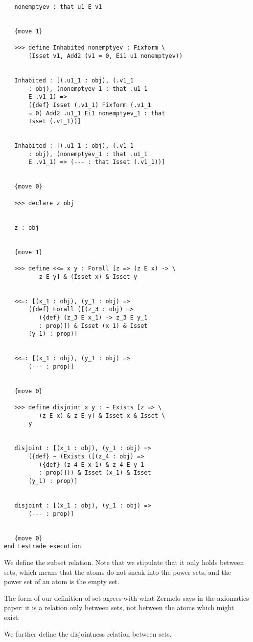\documentclass[12pt]{article}
\begin{document}
\begin{verbatim}
   nonemptyev : that u1 E v1


   {move 1}

   >>> define Inhabited nonemptyev : Fixform \
       (Isset v1, Add2 (v1 = 0, Ei1 u1 nonemptyev))


   Inhabited : [(.u1_1 : obj), (.v1_1 
       : obj), (nonemptyev_1 : that .u1_1 
       E .v1_1) => 
       ({def} Isset (.v1_1) Fixform (.v1_1 
       = 0) Add2 .u1_1 Ei1 nonemptyev_1 : that 
       Isset (.v1_1))]


   Inhabited : [(.u1_1 : obj), (.v1_1 
       : obj), (nonemptyev_1 : that .u1_1 
       E .v1_1) => (--- : that Isset (.v1_1))]


   {move 0}

   >>> declare z obj


   z : obj


   {move 1}

   >>> define <<= x y : Forall [z => (z E x) -> \
          z E y] & (Isset x) & Isset y


   <<=: [(x_1 : obj), (y_1 : obj) => 
       ({def} Forall ([(z_3 : obj) => 
          ({def} (z_3 E x_1) -> z_3 E y_1 
          : prop)]) & Isset (x_1) & Isset 
       (y_1) : prop)]


   <<=: [(x_1 : obj), (y_1 : obj) => 
       (--- : prop)]


   {move 0}

   >>> define disjoint x y : ~ Exists [z => \
          (z E x) & z E y] & Isset x & Isset \
       y


   disjoint : [(x_1 : obj), (y_1 : obj) => 
       ({def} ~ (Exists ([(z_4 : obj) => 
          ({def} (z_4 E x_1) & z_4 E y_1 
          : prop)])) & Isset (x_1) & Isset 
       (y_1) : prop)]


   disjoint : [(x_1 : obj), (y_1 : obj) => 
       (--- : prop)]


   {move 0}
end Lestrade execution
\end{verbatim}

We define the subset relation.  Note that we stipulate that it only holds between sets, which means that the atoms do not sneak into the power sets,
and the power set of an atom is the empty set.

The form of our definition of set agrees with what Zermelo says in the axiomatics paper:  it is a relation only between sets, not between the atoms which might exist. 

We further define the disjointness relation between sets.
\end{document}
